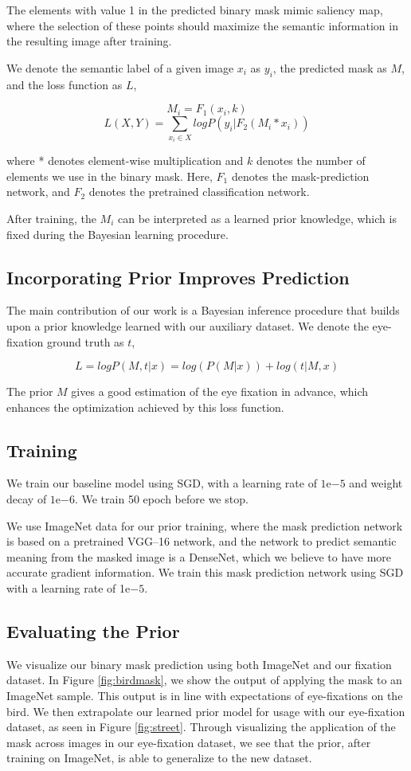 \documentclass[10pt,twocolumn,letterpaper]{article}
\begin{document}
 The elements with value 1 in the predicted binary mask mimic saliency map,
 where the selection of these points should maximize the semantic information
 in the resulting image after training.
 
 We denote the semantic label of a given image $x_i$ as $y_i$, the predicted mask
 as $M$, and the loss function as $L$,

 $$M_i = F_1(x_i, k)$$
 $$L(X, Y) = \sum_{x_i \in X}{logP(y_i | F_2(M_i * x_i))}$$
 
 \noindent where * denotes element-wise multiplication and $k$ denotes the
 number of elements we use in the binary mask. Here, $F_1$ denotes the
 mask-prediction network, and $F_2$ denotes the pretrained classification
 network. 
 
 After training, the $M_i$ can be interpreted as a learned prior knowledge,
 which is fixed during the Bayesian learning procedure.
 
 \subsection{Incorporating Prior Improves Prediction}
 
 The main contribution of our work is a Bayesian inference procedure that
 builds upon a prior knowledge learned with our auxiliary dataset. We denote
 the eye-fixation ground truth as $t$, 
 
 $$L = logP(M, t|x) = log(P(M|x)) + log(t|M, x)$$
 
 The prior $M$ gives a good estimation of the eye fixation in advance, which
 enhances the optimization achieved by this loss function.
 
 
 
\subsection{Training}
We train our baseline model using SGD, with a learning rate of $1$e$-5$ and
weight decay of $1$e$-6$. We train 50 epoch before we stop.

We use ImageNet data for our prior training, where the mask prediction network
is based on a pretrained VGG--16 network, and the network to predict semantic
meaning from the masked image is a DenseNet, which we believe to have more
accurate gradient information. We train this mask prediction network using SGD
with a learning rate of 1e$-5$.

\subsection{Evaluating the Prior} We visualize our binary mask prediction using
both ImageNet and our fixation dataset. In Figure \ref{fig:birdmask}, we show
the output of applying the mask to an ImageNet sample. This output is in line
with expectations of eye-fixations on the bird. We then extrapolate our learned
prior model for usage with our eye-fixation dataset, as seen in Figure
\ref{fig:street}.  Through visualizing the application of the mask across
images in our eye-fixation dataset, we see that the prior, after training on
ImageNet, is able to generalize to the new dataset.
\end{document}
